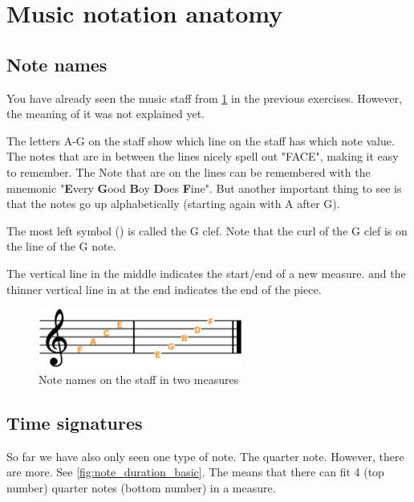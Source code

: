 \section{Music notation anatomy}

\subsection{Note names}

You have already seen the music staff from \ref{fig:music_note_names_on_staff} in the previous exercises. However, the meaning of it was not explained yet.

The letters A-G on the staff show which line on the staff has which note value. The notes that are in between the lines nicely spell out "FACE", making it easy to remember. The Note that are on the lines can be remembered with the mnemonic "\textbf{E}very \textbf{G}ood \textbf{B}oy \textbf{D}oes \textbf{F}ine". But another important thing to see is that the notes go up alphabetically (starting again with A after G). 

The most left symbol (\clefG) is called the G clef. Note that the curl of the G clef is on the line of the G note. 

The vertical line in the middle indicates the start/end of a new measure. and the thinner vertical line in at the end indicates the end of the piece.

\begin{figure}[h]
	\centering
	\includegraphics[width=0.6\textwidth]{../../Images/MusicNotation_MeasureNoteNames.png}
	\caption{Note names on the staff in two measures}
	\label{fig:music_note_names_on_staff}
\end{figure}

\newpage

\subsection{Time signatures}

So far we have also only seen one type of note. The quarter note. However, there are more. See \ref{fig:note_duration_basic}. The  means that there can fit 4 (top number) quarter notes (bottom number) in a measure. 

